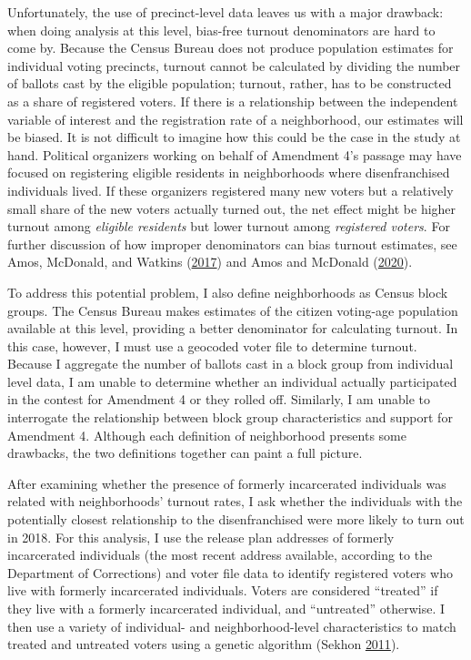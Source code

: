 \documentclass[
  12pt,
]{article}
\begin{document}
Unfortunately, the use of precinct-level data leaves us with a major drawback: when doing analysis at this level, bias-free turnout denominators are hard to come by. Because the Census Bureau does not produce population estimates for individual voting precincts, turnout cannot be calculated by dividing the number of ballots cast by the eligible population; turnout, rather, has to be constructed as a share of registered voters. If there is a relationship between the independent variable of interest and the registration rate of a neighborhood, our estimates will be biased. It is not difficult to imagine how this could be the case in the study at hand. Political organizers working on behalf of Amendment 4's passage may have focused on registering eligible residents in neighborhoods where disenfranchised individuals lived. If these organizers registered many new voters but a relatively small share of the new voters actually turned out, the net effect might be higher turnout among \emph{eligible residents} but lower turnout among \emph{registered voters}. For further discussion of how improper denominators can bias turnout estimates, see Amos, McDonald, and Watkins (\protect\hyperlink{ref-Amos2017}{2017}) and Amos and McDonald (\protect\hyperlink{ref-Amos2020}{2020}).

To address this potential problem, I also define neighborhoods as Census block groups. The Census Bureau makes estimates of the citizen voting-age population available at this level, providing a better denominator for calculating turnout. In this case, however, I must use a geocoded voter file to determine turnout. Because I aggregate the number of ballots cast in a block group from individual level data, I am unable to determine whether an individual actually participated in the contest for Amendment 4 or they rolled off. Similarly, I am unable to interrogate the relationship between block group characteristics and support for Amendment 4. Although each definition of neighborhood presents some drawbacks, the two definitions together can paint a full picture.

After examining whether the presence of formerly incarcerated individuals was related with neighborhoods' turnout rates, I ask whether the individuals with the potentially closest relationship to the disenfranchised were more likely to turn out in 2018. For this analysis, I use the release plan addresses of formerly incarcerated individuals (the most recent address available, according to the Department of Corrections) and voter file data to identify registered voters who live with formerly incarcerated individuals. Voters are considered ``treated'' if they live with a formerly incarcerated individual, and ``untreated'' otherwise. I then use a variety of individual- and neighborhood-level characteristics to match treated and untreated voters using a genetic algorithm (Sekhon \protect\hyperlink{ref-Sekhon2011}{2011}).
\end{document}
